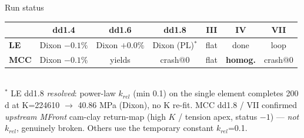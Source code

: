 \documentclass[aspectratio=169]{beamer}
\begin{document}
\begin{frame}{Run status}
\small
\begin{tabular}{l|cccccc}
 & dd1.4 & dd1.6 & dd1.8 & III & IV & VII \\\hline
\textbf{LE}  & Dixon $-0.1\%$ & Dixon $+0.0\%$ & Dixon (PL)$^{*}$ & flat & done & loop \\
\textbf{MCC} & Dixon $-0.1\%$ & yields & crash@0 & flat & \textbf{homog.} & crash@0 \\
\end{tabular}
\vspace{4pt}\\
{\footnotesize $^{*}$ LE dd1.8 \emph{resolved}: power-law $k_{rel}$ (min 0.1) on the single element completes 200\,d at K=224610 $\to$ 40.86 MPa (Dixon), no K re-fit. MCC dd1.8 / VII confirmed \emph{upstream MFront} cam-clay return-map (high $K$ / tension apex, status $-1$) --- \emph{not} $k_{rel}$, genuinely broken. Others use the temporary constant $k_{rel}$=0.1.}
\end{frame}
\end{document}

